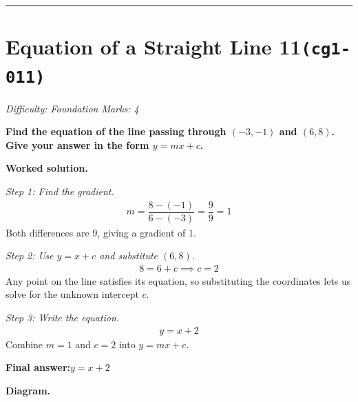 \documentclass[11pt]{article}
\newcommand{\question}[1]{\par\medskip\noindent\textbf{#1}\par}
\begin{document}
\medskip\hrule

\section*{Equation of a Straight Line 11\quad\small\texttt{(cg1-011)}}
\textit{Difficulty: Foundation \quad\textbar\quad Marks: 4}

\question{Find the equation of the line passing through \( (-3, -1) \) and \( (6, 8) \). Give your answer in the form \( y = mx + c \).}

\textbf{Worked solution.}

\textit{Step 1: Find the gradient.}
\[\begin{gathered}
m = \dfrac{8 - (-1)}{6 - (-3)} = \dfrac{9}{9} = 1
\end{gathered}\]
Both differences are 9, giving a gradient of 1.

\textit{Step 2: Use \( y = x + c \) and substitute \( (6, 8) \).}
\[\begin{gathered}
8 = 6 + c \implies c = 2
\end{gathered}\]
Any point on the line satisfies its equation, so substituting the coordinates lets us solve for the unknown intercept \(c\).

\textit{Step 3: Write the equation.}
\[\begin{gathered}
y = x + 2
\end{gathered}\]
Combine \(m = 1\) and \(c = 2\) into \(y = mx + c\).

\begin{answerbox}
\textbf{Final answer:}\quad \(\displaystyle y = x + 2\)
\end{answerbox}
\textbf{Diagram.}
\end{document}
